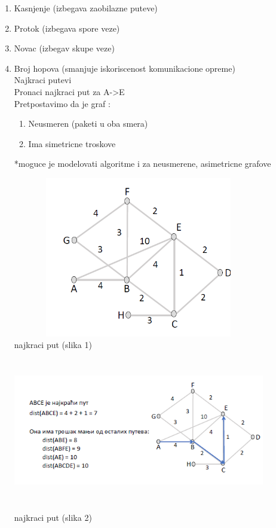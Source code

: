 \documentclass{article} %
\begin{document}
\begin{enumerate}
	\item Kasnjenje (izbegava zaobilazne puteve)
	\item Protok (izbegava spore veze)
	\item Novac (izbegav skupe veze)
	\item Broj hopova (smanjuje iskoriscenost komunikacione opreme)\\
		Najkraci putevi\\
		Pronaci najkraci put za A->E\\
		Pretpostavimo da je graf :
		\begin{enumerate}
			\item Neusmeren (paketi u oba smera)
			\item Ima simetricne troskove
		\end{enumerate}
		*moguce je modelovati algoritme i za neusmerene, asimetricne grafove
		\begin{center}
			\includegraphics[width=11cm, height=7cm]{najkraciPut}\\
			najkraci put (slika 1)
			\includegraphics[width=11cm, height=7cm]{najkraciPut2}\\
			najkraci put (slika 2)

\end{center}
\end{enumerate}
\end{document}
